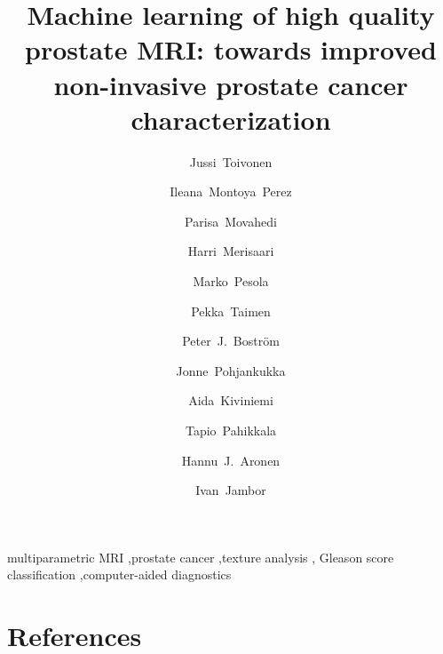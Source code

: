 \documentclass[preprint, sort&compress]{elsarticle}
\begin{document}
\begin{frontmatter}

\title{Machine learning of high quality prostate MRI: towards improved
non-invasive prostate cancer characterization}

\author[dia,inf]{Jussi~Toivonen} 
\author[dia,inf]{Ileana~Montoya~Perez} %
\author[dia,inf]{Parisa~Movahedi} %
\author[dia,inf,pet]{Harri~Merisaari} %
\author[dia]{Marko~Pesola}
\author[pat]{Pekka~Taimen}
\author[uro]{Peter~J.~Boström}
\author[inf]{Jonne~Pohjankukka}
\author[dia,med]{Aida~Kiviniemi}
\author[inf]{Tapio~Pahikkala}
\author[dia,med]{Hannu~J.~Aronen}
\author[dia,rad]{Ivan~Jambor} %


\newcommand{\utu}{University of Turku, Turku, Finland}
\newcommand{\tyks}{Turku University Hospital, Turku, Finland}

\address[dia]{Department of Diagnostic Radiology, \utu}
\address[inf]{Department of Information Technology, \utu}
\address[pet]{Turku PET Centre, \utu}
\address[pat]{Department of Pathology, University of Turku and \tyks}
\address[uro]{Department of Urology, \tyks}
\address[med]{Medical Imaging Centre of Southwest Finland, \tyks}
\address[rad]{Department of Radiology, University of Massachusetts---Baystate,
  Springfield, MA, USA}




\begin{abstract}

\end{abstract}

\begin{keyword}
multiparametric MRI \sep prostate cancer \sep texture analysis \sep
  Gleason score classification \sep computer-aided diagnostics
\end{keyword}

\end{frontmatter}

\linenumbers










\section*{References}

\end{document}
